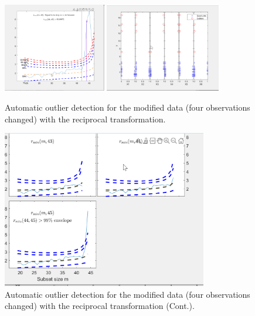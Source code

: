\documentclass[article,shortnames,nojss]{jss}
\begin{document}
\begin{center}
\begin{figure}[H]
\includegraphics[width=0.4\textwidth]{transreg-ex-4b-1.png}
\includegraphics[width=0.45\textwidth]{transreg-ex-4b-2.png}
\caption{Automatic outlier detection for the modified  data (four observations changed) with the reciprocal transformation.}
\label{fig:ex-4b-1}
\end{figure}
\end{center}

\begin{center}
\begin{figure}[H]
\includegraphics[width=0.8\textwidth]{transreg-ex-4b-3.png}
\caption{Automatic outlier detection for the modified  data (four observations changed) with the reciprocal transformation (Cont.).}
\label{fig:ex-4b-2}
\end{figure}
\end{center}


\end{document}
